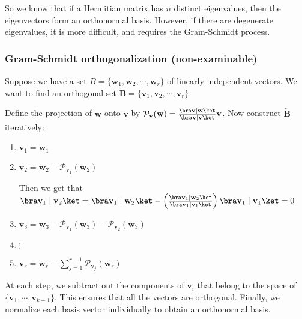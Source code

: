 \documentclass[a4paper]{article}
\begin{document}
So we know that if a Hermitian matrix has $n$ distinct eigenvalues, then the eigenvectors form an orthonormal basis. However, if there are degenerate eigenvalues, it is more difficult, and requires the Gram-Schmidt process.

\subsubsection{Gram-Schmidt orthogonalization (non-examinable)}
Suppose we have a set $B = \{\mathbf{w}_1, \mathbf{w}_2, \cdots, \mathbf{w}_r\}$ of linearly independent vectors. We want to find an orthogonal set $\tilde{\mathbf{B}} = \{\mathbf{v}_1, \mathbf{v}_2, \cdots, \mathbf{v}_r\}$.

Define the projection of $\mathbf{w}$ onto $\mathbf{v}$ by $\mathcal{P}_\mathbf{v}(\mathbf{w}) = \frac{\bra \mathbf{v}\mid \mathbf{w}\ket}{\bra \mathbf{v}\mid \mathbf{v}\ket} \mathbf{v}$. Now construct $\tilde{\mathbf{B}}$ iteratively:
\begin{enumerate}
  \item $\mathbf{v}_1 = \mathbf{w}_1$
  \item $\mathbf{v}_2 = \mathbf{w}_2 - \mathcal{P}_{\mathbf{v}_1}(\mathbf{w}_2)$

    Then we get that $\bra \mathbf{v}_1\mid \mathbf{v}_2\ket = \bra \mathbf{v}_1\mid \mathbf{w}_2\ket - \left(\frac{\bra \mathbf{v}_1\mid \mathbf{w}_2\ket}{\bra \mathbf{v}_1 \mid \mathbf{v}_1\ket}\right) \bra \mathbf{v}_1\mid \mathbf{v}_1\ket = 0$
  \item $\mathbf{v}_3 = \mathbf{w}_3 - \mathcal{P}_{\mathbf{v}_1}(\mathbf{w}_3) - \mathcal{P}_{\mathbf{v}_2}(\mathbf{w}_3)$
  \item $\vdots$
  \item $\displaystyle \mathbf{v}_r = \mathbf{w}_r - \sum_{j = 1}^{r - 1} \mathcal{P}_{\mathbf{v}_j}(\mathbf{w}_r)$
\end{enumerate}
At each step, we subtract out the components of $\mathbf{v}_i$ that belong to the space of $\{\mathbf{v}_1, \cdots, \mathbf{v}_{k - 1}\}$. This ensures that all the vectors are orthogonal. Finally, we normalize each basis vector individually to obtain an orthonormal basis.
\end{document}
